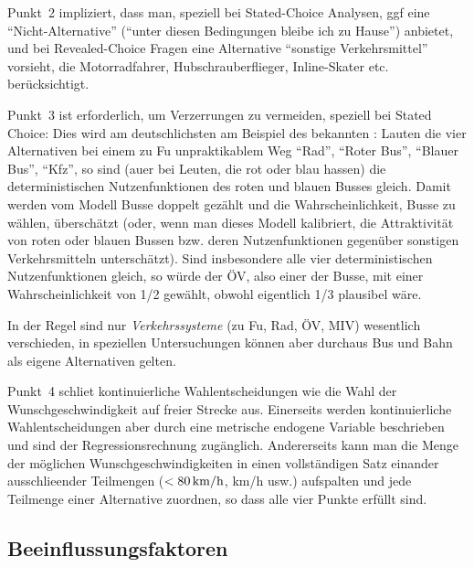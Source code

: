  Punkt~2 impliziert,
dass man, speziell bei Stated-Choice Analysen,  ggf eine
``Nicht-Alternative'' (``unter diesen Bedingungen bleibe ich zu
Hause'') anbietet, und bei Revealed-Choice Fragen eine Alternative
``sonstige Verkehrsmittel'' vorsieht, die Motorradfahrer,
Hubschrauberflieger, Inline-Skater etc. ber\"ucksichtigt. 

Punkt~3  ist
erforderlich, um  Verzerrungen zu
vermeiden, speziell bei Stated Choice: Dies wird am deutschlichsten am
Beispiel des bekannten : 
Lauten die vier Alternativen bei einem zu Fu\3 unpraktikablem Weg
``Rad'', ``Roter Bus'', ``Blauer Bus'', ``Kfz'', so sind (au\3er
bei Leuten, die rot oder blau hassen) die deterministischen
Nutzenfunktionen des roten und blauen Busses gleich. Damit werden
vom Modell Busse doppelt gez\"ahlt und die Wahrscheinlichkeit, Busse
zu w\"ahlen, \"ubersch\"atzt (oder, wenn man dieses Modell kalibriert,
die Attraktivit\"at von roten oder blauen Bussen bzw. deren
Nutzenfunktionen gegen\"uber sonstigen
Verkehrsmitteln untersch\"atzt). Sind insbesondere alle vier
deterministischen Nutzenfunktionen gleich, so w\"urde der \"OV, also
einer der Busse, mit einer Wahrscheinlichkeit von 1/2 gew\"ahlt,
obwohl eigentlich 1/3 plausibel w\"are.

In der Regel sind nur
\emph{Verkehrssysteme} (zu Fu\3, Rad, \"OV, MIV) wesentlich
verschieden, in speziellen Untersuchungen k\"onnen aber durchaus Bus
und Bahn als eigene Alternativen gelten.

Punkt~4 schlie\3t kontinuierliche Wahlentscheidungen wie die Wahl der
Wunsch\-geschwin\-digkeit auf freier Strecke aus. Einerseits werden kontinuierliche
Wahlentscheidungen aber durch eine metrische endogene
Variable beschrieben und sind der Regressionsrechnung
zug\"anglich. Andererseits kann man die Menge der m\"oglichen
Wunschgeschwindigkeiten in einen vollst\"andigen Satz einander
ausschlie\3ender Teilmengen ($<\unit[80]{km/h}$, \unit[80-100]{km/h}
usw.) aufspalten und jede Teilmenge einer Alternative zuordnen, so dass alle vier Punkte 
erf\"ullt sind.




\subsection{\label{sec:discrExogen}Beeinflussungsfaktoren}

